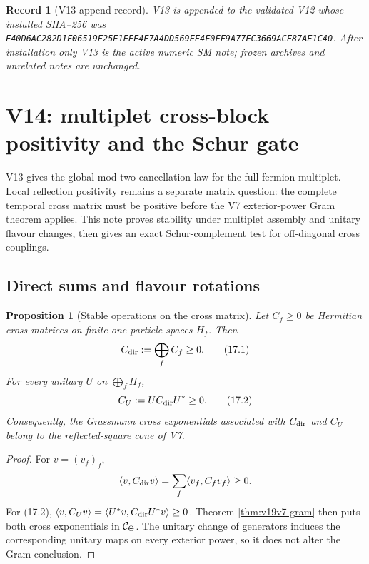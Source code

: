 \documentclass[11pt]{article}
\newtheorem{proposition}[theorem]{Proposition}
\newtheorem{record}[theorem]{Record}
\theoremstyle{remark}
\begin{document}
\begin{record}[V13 append record]
\label{rec:v19v13}
V13 is appended to the validated V12 whose installed SHA--256 was
\texttt{F40D6AC282D1F06519F25E1EFF4F7A4DD569EF4F0FF9A77EC3669ACF87AE1C40}.
After installation only V13 is the active numeric SM note; frozen archives
and unrelated notes are unchanged.
\end{record}




\section{V14: multiplet cross-block positivity and the Schur gate}
\label{sec:v19v14}

V13 gives the global mod-two cancellation law for the full fermion
multiplet.  Local reflection positivity remains a separate matrix
question: the complete temporal cross matrix must be positive before the
V7 exterior-power Gram theorem applies.  This note proves stability under
multiplet assembly and unitary flavour changes, then gives an exact
Schur-complement test for off-diagonal cross couplings.

\subsection{Direct sums and flavour rotations}

\begin{proposition}[Stable operations on the cross matrix]
\label{prop:v19v14-stable}
Let \(C_f\geq0\) be Hermitian cross matrices on finite one-particle spaces
\(H_f\).  Then
\[
 C_{\rm dir}:=\bigoplus_f C_f\geq0.                            \tag{17.1}
\]
For every unitary \(U\) on \(\bigoplus_fH_f\),
\[
 C_U:=UC_{\rm dir}U^*\geq0.                                   \tag{17.2}
\]
Consequently, the Grassmann cross exponentials associated with
\(C_{\rm dir}\) and \(C_U\) belong to the reflected-square cone of V7.
\end{proposition}

\begin{proof}
For \(v=(v_f)_f\),
\[
 \langle v,C_{\rm dir}v\rangle
 =\sum_f\langle v_f,C_fv_f\rangle\geq0.
\]
For (17.2),
\(\langle v,C_Uv\rangle=\langle U^*v,C_{\rm dir}U^*v\rangle\geq0\).
Theorem \ref{thm:v19v7-gram} then puts both cross exponentials in
\({\cal C}_\Theta\).  The unitary change of generators induces the
corresponding unitary maps on every exterior power, so it does not alter
the Gram conclusion.
\end{proof}
\end{document}
